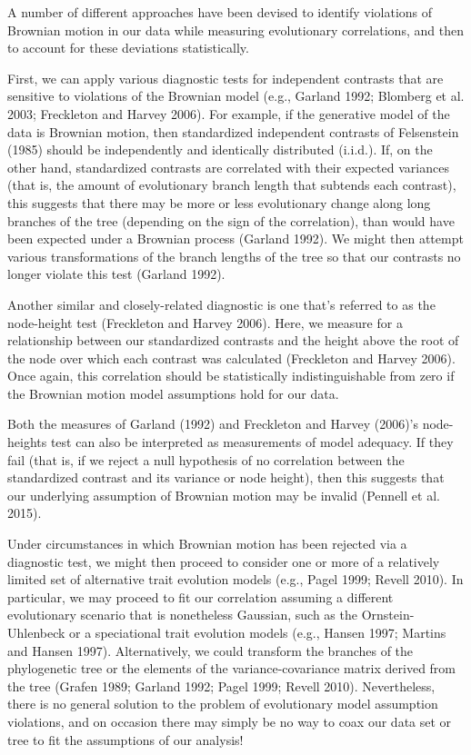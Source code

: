 \documentclass[fleqn,10pt,lineno]{wlpeerj} %
\begin{document}
A number of different approaches have been devised to identify violations of Brownian motion in our data while measuring evolutionary correlations, and then to account for these deviations statistically.

First, we can apply various diagnostic tests for independent contrasts that are sensitive to violations of the Brownian model (e.g., Garland 1992; Blomberg et al. 2003; Freckleton and Harvey 2006). For example, if the generative model of the data is Brownian motion, then standardized independent contrasts of Felsenstein (1985) should be independently and identically distributed (i.i.d.). If, on the other hand, standardized contrasts are correlated with their expected variances (that is, the amount of evolutionary branch length that subtends each contrast), this suggests that there may be more or less evolutionary change along long branches of the tree (depending on the sign of the correlation), than would have been expected under a Brownian process (Garland 1992). We might then attempt various transformations of the branch lengths of the tree so that our contrasts no longer violate this test (Garland 1992).

Another similar and closely-related diagnostic is one that's referred to as the node-height test (Freckleton and Harvey 2006). Here, we measure for a relationship between our standardized contrasts and the height above the root of the node over which each contrast was calculated (Freckleton and Harvey 2006). Once again, this correlation should be statistically indistinguishable from zero if the Brownian motion model assumptions hold for our data.

Both the measures of Garland (1992) and Freckleton and Harvey (2006)'s node-heights test can also be interpreted as measurements of model adequacy. If they fail (that is, if we reject a null hypothesis of no correlation between the standardized contrast and its variance or node height), then this suggests that our underlying assumption of Brownian motion may be invalid (Pennell et al. 2015).

Under circumstances in which Brownian motion has been rejected via a diagnostic test, we might then proceed to consider one or more of a relatively limited set of alternative trait evolution models (e.g., Pagel 1999; Revell 2010). In particular, we may proceed to fit our correlation assuming a different evolutionary scenario that is nonetheless Gaussian, such as the Ornstein-Uhlenbeck or a speciational trait evolution models (e.g., Hansen 1997; Martins and Hansen 1997). Alternatively, we could transform the branches of the phylogenetic tree or the elements of the variance-covariance matrix derived from the tree (Grafen 1989; Garland 1992; Pagel 1999; Revell 2010). Nevertheless, there is no general solution to the problem of evolutionary model assumption violations, and on occasion there may simply be no way to coax our data set or tree to fit the assumptions of our analysis!
\end{document}
